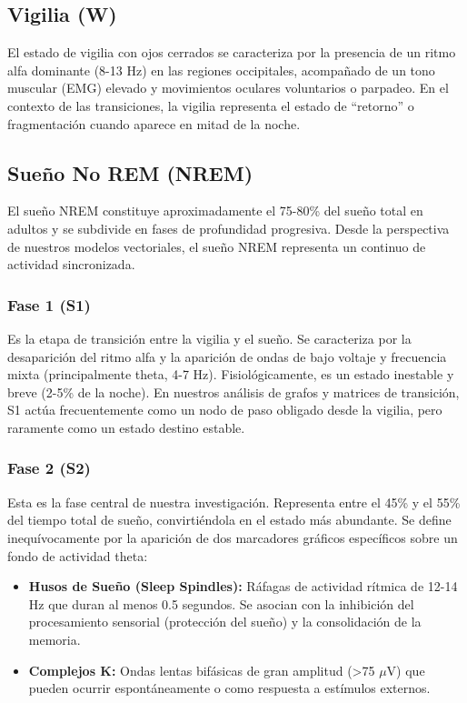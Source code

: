 \subsection{Vigilia (W)}

El estado de vigilia con ojos cerrados se caracteriza por la presencia de un ritmo alfa dominante (8-13 Hz) en las regiones occipitales, acompañado de un tono muscular (EMG) elevado y movimientos oculares voluntarios o parpadeo. En el contexto de las transiciones, la vigilia representa el estado de ``retorno'' o fragmentación cuando aparece en mitad de la noche.

\subsection{Sueño No REM (NREM)}

El sueño NREM constituye aproximadamente el 75-80\% del sueño total en adultos y se subdivide en fases de profundidad progresiva. Desde la perspectiva de nuestros modelos vectoriales, el sueño NREM representa un continuo de actividad sincronizada.

\subsubsection{Fase 1 (S1)}

Es la etapa de transición entre la vigilia y el sueño. Se caracteriza por la desaparición del ritmo alfa y la aparición de ondas de bajo voltaje y frecuencia mixta (principalmente theta, 4-7 Hz). Fisiológicamente, es un estado inestable y breve (2-5\% de la noche). En nuestros análisis de grafos y matrices de transición, S1 actúa frecuentemente como un nodo de paso obligado desde la vigilia, pero raramente como un estado destino estable.

\subsubsection{Fase 2 (S2)}

Esta es la fase central de nuestra investigación. Representa entre el 45\% y el 55\% del tiempo total de sueño, convirtiéndola en el estado más abundante. Se define inequívocamente por la aparición de dos marcadores gráficos específicos sobre un fondo de actividad theta:
\begin{itemize}
    \item \textbf{Husos de Sueño (Sleep Spindles):} Ráfagas de actividad rítmica de 12-14 Hz que duran al menos 0.5 segundos. Se asocian con la inhibición del procesamiento sensorial (protección del sueño) y la consolidación de la memoria.
    \item \textbf{Complejos K:} Ondas lentas bifásicas de gran amplitud (>75 $\mu$V) que pueden ocurrir espontáneamente o como respuesta a estímulos externos.
\end{itemize}

